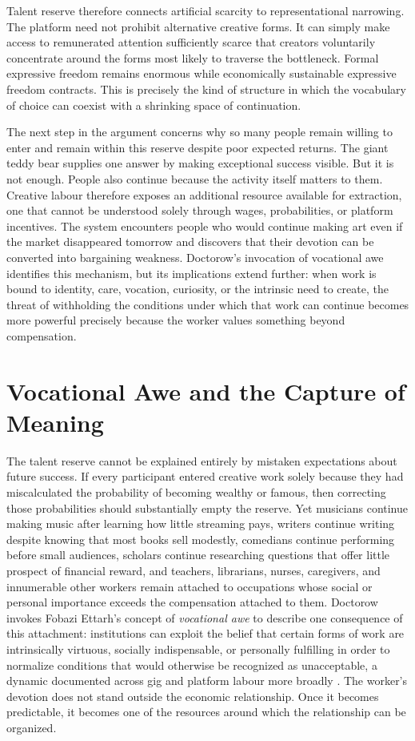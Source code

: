 \documentclass[11pt]{article}
\begin{document}
Talent reserve therefore connects artificial scarcity to representational narrowing. The platform need not prohibit alternative creative forms. It can simply make access to remunerated attention sufficiently scarce that creators voluntarily concentrate around the forms most likely to traverse the bottleneck. Formal expressive freedom remains enormous while economically sustainable expressive freedom contracts. This is precisely the kind of structure in which the vocabulary of choice can coexist with a shrinking space of continuation.

The next step in the argument concerns why so many people remain willing to enter and remain within this reserve despite poor expected returns. The giant teddy bear supplies one answer by making exceptional success visible. But it is not enough. People also continue because the activity itself matters to them. Creative labour therefore exposes an additional resource available for extraction, one that cannot be understood solely through wages, probabilities, or platform incentives. The system encounters people who would continue making art even if the market disappeared tomorrow and discovers that their devotion can be converted into bargaining weakness. Doctorow's invocation of vocational awe identifies this mechanism, but its implications extend further: when work is bound to identity, care, vocation, curiosity, or the intrinsic need to create, the threat of withholding the conditions under which that work can continue becomes more powerful precisely because the worker values something beyond compensation.

\section{Vocational Awe and the Capture of Meaning}

The talent reserve cannot be explained entirely by mistaken expectations about future success. If every participant entered creative work solely because they had miscalculated the probability of becoming wealthy or famous, then correcting those probabilities should substantially empty the reserve. Yet musicians continue making music after learning how little streaming pays, writers continue writing despite knowing that most books sell modestly, comedians continue performing before small audiences, scholars continue researching questions that offer little prospect of financial reward, and teachers, librarians, nurses, caregivers, and innumerable other workers remain attached to occupations whose social or personal importance exceeds the compensation attached to them. Doctorow invokes Fobazi Ettarh's concept of \emph{vocational awe} \citep{ettarh2018vocationalawe} to describe one consequence of this attachment: institutions can exploit the belief that certain forms of work are intrinsically virtuous, socially indispensable, or personally fulfilling in order to normalize conditions that would otherwise be recognized as unacceptable, a dynamic documented across gig and platform labour more broadly \citep{rosenblat2018uberland,gray2019ghostwork,wood2020goodgig}. The worker's devotion does not stand outside the economic relationship. Once it becomes predictable, it becomes one of the resources around which the relationship can be organized.
\end{document}
